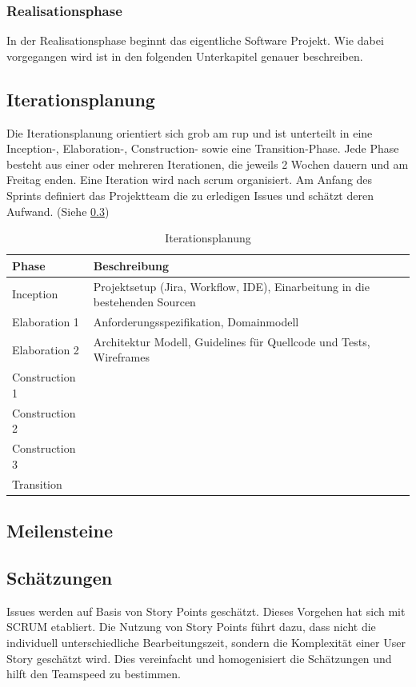 \documentclass[11pt,a4paper,english,oneside]{book}
\numberwithin{equation}{chapter}
\begin{document}
	\subsubsection{Realisationsphase}
	In der Realisationsphase beginnt das eigentliche Software Projekt. Wie dabei vorgegangen wird ist in den folgenden Unterkapitel genauer beschreiben. 
	
	\subsection{Iterationsplanung}
	
	Die Iterationsplanung orientiert sich grob am \gls{rup} und ist unterteilt in eine Inception-, Elaboration-, Construction- sowie eine Transition-Phase. Jede Phase besteht aus einer oder mehreren Iterationen, die jeweils 2 Wochen dauern und am Freitag enden. Eine Iteration wird nach \gls{scrum} organisiert. Am Anfang des Sprints definiert das Projektteam die zu erledigen Issues und schätzt deren Aufwand. (Siehe \ref{sec:estimations})
	
	\begin{table}[h!]
		\centering
		\begin{tabularx}{\linewidth}{l X }
			\toprule 
			Phase & Beschreibung \\
			\midrule
			Inception & Projektsetup (Jira, Workflow, IDE), Einarbeitung in die bestehenden Sourcen \\
			Elaboration 1 & Anforderungsspezifikation, Domainmodell \\
			Elaboration 2 & Architektur Modell, Guidelines für Quellcode und Tests, Wireframes \\
			Construction 1 & \\
			Construction 2 & \\
			Construction 3 &  \\
			Transition&   \\
			\bottomrule 
		\end{tabularx} 
		\caption{Iterationsplanung}
	\end{table}

	\subsection{Meilensteine}
	
	\subsection{Schätzungen}
	\label{sec:estimations}
	Issues werden auf Basis von Story Points geschätzt. Dieses Vorgehen hat sich mit SCRUM etabliert. Die Nutzung von Story Points führt dazu, dass nicht die individuell unterschiedliche Bearbeitungszeit, sondern die Komplexität einer User Story geschätzt wird. Dies vereinfacht  und homogenisiert die Schätzungen und hilft den Teamspeed zu bestimmen.\cite{storypoints, storypoints2}
	
\end{document}
